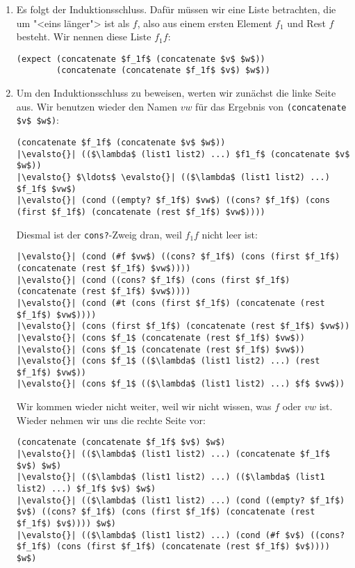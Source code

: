 \begin{enumerate}
\item Es folgt der Induktionsschluss.  Dafür müssen wir eine Liste
  betrachten, die um "<eins länger"> ist als $f$, also aus einem
  ersten Element $f_1$ und Rest $f$ besteht.  Wir nennen diese Liste
  $f_1f$:
\begin{lstlisting}
(expect (concatenate $f_1f$ (concatenate $v$ $w$))
        (concatenate (concatenate $f_1f$ $v$) $w$))
\end{lstlisting}
\item Um den Induktionsschluss zu beweisen, werten wir zunächst die
  linke Seite aus.  Wir benutzen wieder den Namen $vw$ für das
  Ergebnis von \lstinline{(concatenate $v$ $w$)}:
\begin{lstlisting}
(concatenate $f_1f$ (concatenate $v$ $w$))
|\evalsto{}| (($\lambda$ (list1 list2) ...) $f1_f$ (concatenate $v$ $w$))
|\evalsto{} $\ldots$ \evalsto{}| (($\lambda$ (list1 list2) ...) $f_1f$ $vw$)
|\evalsto{}| (cond ((empty? $f_1f$) $vw$) ((cons? $f_1f$) (cons (first $f_1f$) (concatenate (rest $f_1f$) $vw$))))
\end{lstlisting}
  Diesmal ist der \lstinline{cons?}-Zweig dran, weil $f_1f$ nicht leer ist:
\begin{lstlisting}
|\evalsto{}| (cond (#f $vw$) ((cons? $f_1f$) (cons (first $f_1f$) (concatenate (rest $f_1f$) $vw$))))
|\evalsto{}| (cond ((cons? $f_1f$) (cons (first $f_1f$) (concatenate (rest $f_1f$) $vw$))))
|\evalsto{}| (cond (#t (cons (first $f_1f$) (concatenate (rest $f_1f$) $vw$))))
|\evalsto{}| (cons (first $f_1f$) (concatenate (rest $f_1f$) $vw$))
|\evalsto{}| (cons $f_1$ (concatenate (rest $f_1f$) $vw$))
|\evalsto{}| (cons $f_1$ (concatenate (rest $f_1f$) $vw$))
|\evalsto{}| (cons $f_1$ (($\lambda$ (list1 list2) ...) (rest $f_1f$) $vw$))
|\evalsto{}| (cons $f_1$ (($\lambda$ (list1 list2) ...) $f$ $vw$))
\end{lstlisting}
  Wir kommen wieder nicht weiter, weil wir nicht wissen, was $f$ oder
  $vw$ ist.  Wieder nehmen wir uns die rechte Seite vor:
\begin{lstlisting}
(concatenate (concatenate $f_1f$ $v$) $w$)
|\evalsto{}| (($\lambda$ (list1 list2) ...) (concatenate $f_1f$ $v$) $w$)
|\evalsto{}| (($\lambda$ (list1 list2) ...) (($\lambda$ (list1 list2) ...) $f_1f$ $v$) $w$)
|\evalsto{}| (($\lambda$ (list1 list2) ...) (cond ((empty? $f_1f$) $v$) ((cons? $f_1f$) (cons (first $f_1f$) (concatenate (rest $f_1f$) $v$)))) $w$)
|\evalsto{}| (($\lambda$ (list1 list2) ...) (cond (#f $v$) ((cons? $f_1f$) (cons (first $f_1f$) (concatenate (rest $f_1f$) $v$)))) $w$)

\end{lstlisting}
\end{enumerate}

